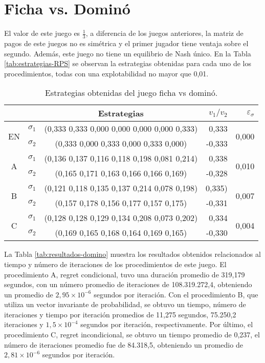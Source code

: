 \section*{Ficha vs. Dominó}

El valor de este juego es $\frac{1}{3}$, a diferencia de los juegos anteriores, la matriz de pagos de este juegos no es simétrica y el primer jugador tiene ventaja sobre el segundo. Además, este juego no tiene un equilibrio de Nash único. En la Tabla \ref{tab:estrategias-RPS} se observan la estrategias obtenidas para cada uno de los procedimientos, todas con una explotabilidad no mayor que 0,01.

\begin{table}[h]
    \centering
    \caption{Estrategias obtenidas del juego ficha vs dominó.}
    \label{tab:estrategias-domino}
    \begin{tabular}{c c c r r}
        \toprule
        & & Estrategias & $v_1 / v_2$ & $\varepsilon_{\sigma}$ \\
        \midrule
        \multirow{2}{*}{EN}
        & $\sigma_1$ & (0,333 0,333 0,000 0,000 0,000 0,000 0,333) & 0,333 & \multirow{2}{*}{0,000}\\
        & $\sigma_2$ & (0,333 0,000 0,333 0,000 0,333 0,000) &  -0,333 & \\
        \midrule
        \multirow{2}{*}{A}
        & $\sigma_1$ & (0,136 0,137 0,116 0,118 0,198 0,081 0,214) & 0,338 &\multirow{2}{*}{0,010} \\
        & $\sigma_2$ & (0,165 0,171 0,163 0,166 0,166 0,169) & -0,328 &\\
        \midrule
        \multirow{2}{*}{B}
        & $\sigma_1$ & (0,121 0,118 0,135 0,137 0,214 0,078 0,198) & 0,335) & \multirow{2}{*}{0,007} \\
        & $\sigma_2$ & (0,157 0,178 0,156 0,177 0,157 0,175) & -0,331 & \\
        \midrule
        \multirow{2}{*}{C}
        & $\sigma_1$ & (0,128 0,128 0,129 0,134 0,208 0,073 0,202) & 0,334 & \multirow{2}{*}{0,004} \\
        & $\sigma_2$ & (0,169 0,165 0,168 0,164 0,169 0,165) & -0,330 & \\
        \bottomrule
    \end{tabular}
\end{table}

La Tabla \ref{tab:resultados-domino} muestra los resultados obtenidos relacionados al tiempo y número de iteraciones de los procedimientos de este juego. El procedimiento A, regret condicional, tuvo una duración promedio de 319,179 segundos, con un número promedio de iteraciones de 108.319.272,4, obteniendo un promedio de $2,95 {\times} 10^{-6}$ segundos por iteración. Con el procedimiento B, que utiliza un vector invariante de probabilidad, se obtuvo un tiempo, número de iteraciones y tiempo por iteración promedios de 11,275 segundos, 75.250,2 iteraciones y $1,5 {\times} 10^{-4}$ segundos por iteración, respectivamente. Por último, el procedimiento C, regret incondicional, se obtuvo un tiempo promedio de 0,237, el número de iteraciones promedio fue de 84.318,5, obteniendo un promedio de $2,81 {\times} 10^{-6}$ segundos por iteración. 

